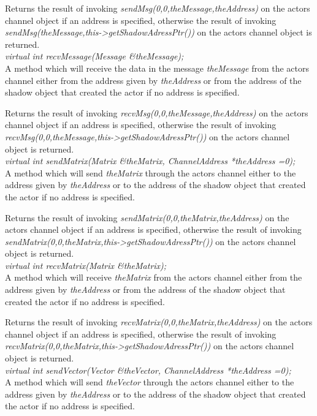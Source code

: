 Returns the result of invoking {\em sendMsg(0,0,theMessage,theAddress)} on
the actors channel object if an address is specified, otherwise
the result of invoking {\em
sendMsg(theMessage,this->getShadowAdressPtr())} on the actors channel
object is returned. \\ 


{\em virtual int recvMessage(Message \&theMessage);} \\
A method which will receive the data in the message {\em theMessage} from
the actors channel either from the address given by {\em
theAddress} or from the address of the shadow object that created the
actor if no address is specified.

Returns the result of invoking {\em recvMsg(0,0,theMessage,theAddress)} on
the actors channel object if an address is specified, otherwise
the result of invoking {\em
recvMsg(0,0,theMessage,this->getShadowAdressPtr())} on the actors channel
object is returned. \\ 

{\em virtual int sendMatrix(Matrix \&theMatrix, ChannelAddress
*theAddress =0);}\\
A method which will send {\em theMatrix} 
through the actors channel either to the address given by {\em
theAddress} or to the address of the shadow object that created the
actor if no address is specified.

Returns the result of invoking {\em sendMatrix(0,0,theMatrix,theAddress)} on
the actors channel object if an address is specified, otherwise
the result of invoking {\em
sendMatrix(0,0,theMatrix,this->getShadowAdressPtr())} on the actors channel
object is returned. \\ 


{\em virtual int recvMatrix(Matrix \&theMatrix);} \\
A method which will receive {\em theMatrix} from
the actors channel either from the address given by {\em
theAddress} or from the address of the shadow object that created the
actor if no address is specified.

Returns the result of invoking {\em recvMatrix(0,0,theMatrix,theAddress)} on
the actors channel object if an address is specified, otherwise
the result of invoking {\em
recvMatrix(0,0,theMatrix,this->getShadowAdressPtr())} on the actors channel
object is returned. \\ 

{\em virtual int sendVector(Vector \&theVector, ChannelAddress
*theAddress =0);}\\
A method which will send {\em theVector} 
through the actors channel either to the address given by {\em
theAddress} or to the address of the shadow object that created the
actor if no address is specified.


